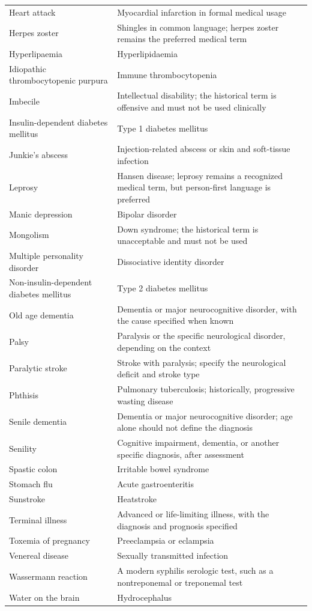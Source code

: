 \begin{longtable}{>{\raggedright\arraybackslash}p{} >{\raggedright\arraybackslash}p{}}
Heart attack & Myocardial infarction in formal medical usage \\
Herpes zoster & Shingles in common language; herpes zoster remains the preferred medical term \\
Hyperlipaemia & Hyperlipidaemia \\
Idiopathic thrombocytopenic purpura & Immune thrombocytopenia \\
Imbecile & Intellectual disability; the historical term is offensive and must not be used clinically \\
Insulin-dependent diabetes mellitus & Type 1 diabetes mellitus \\
Junkie's abscess & Injection-related abscess or skin and soft-tissue infection \\
Leprosy & Hansen disease; leprosy remains a recognized medical term, but person-first language is preferred \\
Manic depression & Bipolar disorder \\
Mongolism & Down syndrome; the historical term is unacceptable and must not be used \\
Multiple personality disorder & Dissociative identity disorder \\
Non-insulin-dependent diabetes mellitus & Type 2 diabetes mellitus \\
Old age dementia & Dementia or major neurocognitive disorder, with the cause specified when known \\
Palsy & Paralysis or the specific neurological disorder, depending on the context \\
Paralytic stroke & Stroke with paralysis; specify the neurological deficit and stroke type \\
Phthisis & Pulmonary tuberculosis; historically, progressive wasting disease \\
Senile dementia & Dementia or major neurocognitive disorder; age alone should not define the diagnosis \\
Senility & Cognitive impairment, dementia, or another specific diagnosis, after assessment \\
Spastic colon & Irritable bowel syndrome \\
Stomach flu & Acute gastroenteritis \\
Sunstroke & Heatstroke \\
Terminal illness & Advanced or life-limiting illness, with the diagnosis and prognosis specified \\
Toxemia of pregnancy & Preeclampsia or eclampsia \\
Venereal disease & Sexually transmitted infection \\
Wassermann reaction & A modern syphilis serologic test, such as a nontreponemal or treponemal test \\
Water on the brain & Hydrocephalus \\
\end{longtable}
